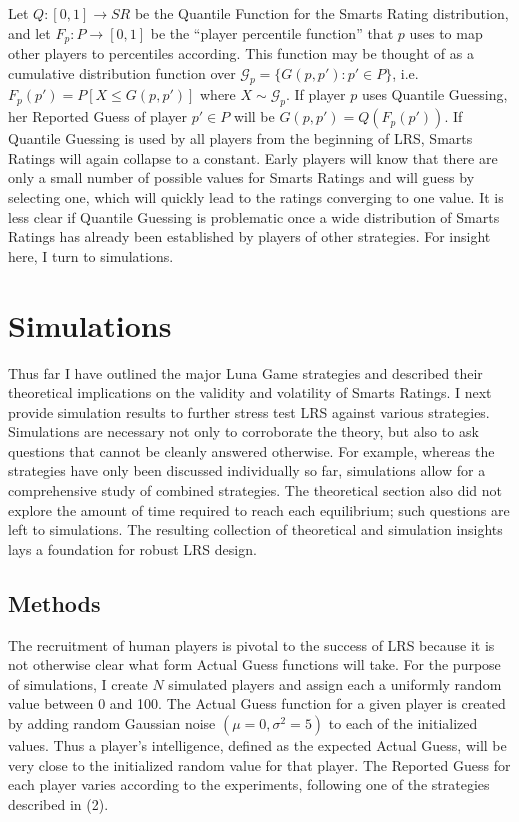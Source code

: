 Let $Q : [0, 1] \to SR$ be the Quantile Function for the Smarts Rating distribution, and let $F_p : P \to [0, 1]$ be the ``player percentile function'' that $p$ uses to map other players to percentiles according. This function may be thought of as a cumulative distribution function over $\mathcal{G}_p = \{G(p, p') : p' \in P\}$, i.e. $F_p(p') = P[X \le G(p, p')]$ where $X \sim \mathcal{G}_p$. If player $p$ uses Quantile Guessing, her Reported Guess of player $p' \in P$ will be $G(p, p') = Q(F_p(p'))$. If Quantile Guessing is used by all players from the beginning of LRS, Smarts Ratings will again collapse to a constant. Early players will know that there are only a small number of possible values for Smarts Ratings and will guess by selecting one, which will quickly lead to the ratings converging to one value. It is less clear if Quantile Guessing is problematic once a wide distribution of Smarts Ratings has already been established by players of other strategies. For insight here, I turn to simulations.

\section{Simulations}

Thus far I have outlined the major Luna Game strategies and described their theoretical implications on the validity and volatility of Smarts Ratings. I next provide simulation results to further stress test LRS against various strategies. Simulations are necessary not only to corroborate the theory, but also to ask questions that cannot be cleanly answered otherwise. For example, whereas the strategies have only been discussed individually so far, simulations allow for a comprehensive study of combined strategies. The theoretical section also did not explore the amount of time required to reach each equilibrium; such questions are left to simulations. The resulting collection of theoretical and simulation insights lays a foundation for robust LRS design.

\subsection{Methods}

The recruitment of human players is pivotal to the success of LRS because it is not otherwise clear what form Actual Guess functions will take. For the purpose of simulations, I create $N$ simulated players and assign each a uniformly random value between 0 and 100. The Actual Guess function for a given player is created by adding random Gaussian noise $(\mu = 0, \sigma^2 = 5)$ to each of the initialized values. Thus a player's intelligence, defined as the expected Actual Guess, will be very close to the initialized random value for that player. The Reported Guess for each player varies according to the experiments, following one of the strategies described in (2). 


